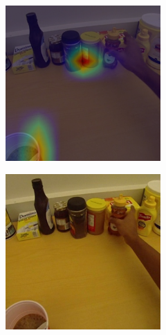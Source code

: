 \documentclass[10pt,twocolumn,hidelinks,letterpaper]{article}
\begin{document}
\begin{figure}[t]
\begin{subfigure}{.32\linewidth}
  \end{subfigure}
  \begin{subfigure}{.32\linewidth}
  	\includegraphics[width=\linewidth]{images/Cams2/S2_take_honey/rgb0004_CAM_MS.png}
  \end{subfigure}
  \begin{subfigure}{.32\linewidth}
  	\includegraphics[width=\linewidth]{images/Cams2/S2_take_honey/rgb0007.png}

\end{subfigure}
\end{figure}
\end{document}
